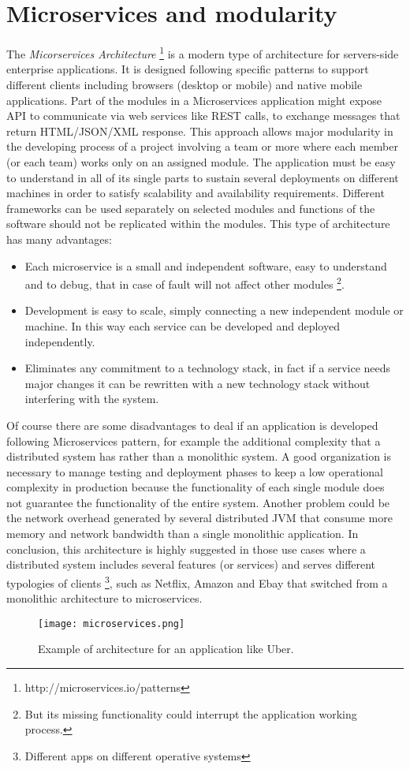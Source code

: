 \section{Microservices and modularity}
\label{sec:4}
The \textit{Micorservices Architecture} \footnote{http://microservices.io/patterns} is a modern type of architecture for servers-side enterprise applications. It is designed following specific patterns to support different clients including browsers (desktop or mobile) and native mobile applications. Part of the modules in a Microservices application might expose API to communicate via web services like REST calls, to exchange messages that return HTML/JSON/XML response.
This approach allows major modularity in the developing process of a project involving a team or more where each member (or each team) works only on an assigned module.
The application must be easy to understand in all of its single parts to sustain several deployments on different machines in order to satisfy scalability and availability requirements.
Different frameworks can be used separately on selected modules and functions of the software should not be replicated within the modules.
This type of architecture has many advantages:
\begin{itemize}
	\item Each microservice is a small and independent software, easy to understand and to debug, that in case of fault will not affect other modules \footnote{But its missing functionality could interrupt the application working process.}.
	\item Development is easy to scale, simply connecting a new independent module or machine. In this way each service can be developed and deployed independently.
	\item Eliminates any commitment to a technology stack, in fact if a service needs major changes  it can be rewritten with a new technology stack without interfering with the system.
\end{itemize}
Of course there are some disadvantages to deal if an application is developed following Microservices pattern, for example the additional complexity that a distributed system has rather than a monolithic system.
A good organization is necessary to manage testing and deployment phases  to keep a low operational complexity in production because the functionality of each single module does not guarantee the functionality of the entire system.
Another problem could be the network overhead generated by several distributed JVM that consume more memory and  network bandwidth than a single monolithic application.
In conclusion, this architecture is highly suggested in those use cases where a distributed system  includes several features (or services) and serves different typologies of clients \footnote{Different apps on different operative systems}, such as Netflix, Amazon and Ebay that switched from a monolithic architecture to microservices.
\begin{figure}[H]
\texttt{[image: microservices.png]}
\centering
\caption{Example of architecture for an application like Uber.}
\end{figure}

